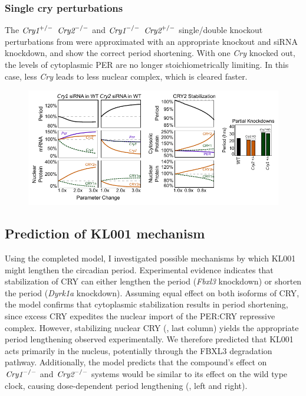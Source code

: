 \subsubsection{Single cry perturbations}
The $\text{\it Cry1}^{+/-}$ $\text{\it Cry2}^{-/-}$ and $\text{\it Cry1}^{-/-}$ $\text{\it Cry2}^{+/-}$ single/double knockout perturbations from \cite{VanderHorst1999} were approximated with an appropriate knockout and siRNA knockdown, and show the correct period shortening. 
With one {\it Cry} knocked out, the levels of cytoplasmic PER are no longer stoichiometrically limiting. 
In this case, less {\it Cry} leads to less nuclear complex, which is cleared faster.

\begin{figure}[bt]
  \centering
  \includegraphics[width=\textwidth]{chap2/figures/experimentalvalidation.pdf}
   \label{fig:experimentalvalidation}
\end{figure}

\subsection{Prediction of KL001 mechanism}
Using the completed model, I investigated possible mechanisms by which KL001 might lengthen the circadian period. 
Experimental evidence indicates that stabilization of CRY can either lengthen the period ({\it Fbxl3} knockdown) or shorten the period ({\it Dyrk1a} knockdown). 
Assuming equal effect on both isoforms of CRY, the model confirms that cytoplasmic stabilization results in period shortening, since excess CRY expedites the nuclear import of the PER:CRY repressive complex. 
However, stabilizing nuclear CRY (, last column) yields the appropriate period lengthening observed experimentally. 
We therefore predicted that KL001 acts primarily in the nucleus, potentially through the FBXL3 degradation pathway. 
Additionally, the model predicts that the compound’s effect on $\text{\it Cry1}^{-/-}$ and $\text{\it Cry2}^{-/-}$ systems would be similar to its effect on the wild type clock, causing dose-dependent period lengthening (, left and right).



